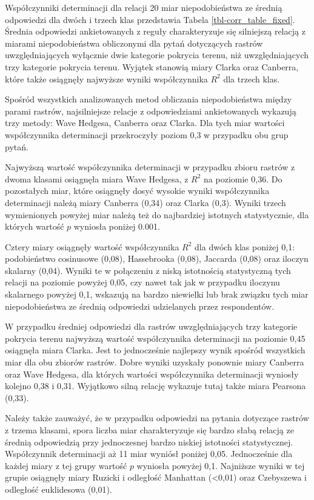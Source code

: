 \documentclass{amuthesis}
\begin{document}
Współczynniki determinacji dla relacji 20 miar niepodobieństwa ze
średnią odpowiedzi dla dwóch i trzech klas przedstawia Tabela
\ref{tbl-corr_table_fixed}. Średnia odpowiedzi ankietowanych z reguły
charakteryzuje się silniejszą relacją z miarami niepodobieństwa
obliczonymi dla pytań dotyczących rastrów uwzględniających wyłącznie
dwie kategorie pokrycia terenu, niż uwzględniających trzy kategorie
pokrycia terenu. Wyjątek stanowią miary Clarka oraz Canberra, które
także osiągnęły najwyższe wyniki współczynnika \(R^2\) dla trzech klas.

Spośród wszystkich analizowanych metod obliczania niepodobieństwa między
parami rastrów, najsilniejsze relacje z odpowiedziami ankietowanych
wykazują trzy metody: Wave Hedgesa, Canberra oraz Clarka. Dla tych miar
wartości współczynnika determinacji przekroczyły poziom 0,3 w przypadku
obu grup pytań.

Najwyższą wartość współczynnika determinacji w przypadku zbioru rastrów
z dwoma klasami osiągnęła miara Wave Hedgesa, z \(R^2\) na poziomie
0,36. Do pozostałych miar, które osiągnęły dosyć wysokie wyniki
współczynnika determinacji należą miary Canberra (0,34) oraz Clarka
(0,3). Wyniki trzech wymienionych powyżej miar należą też do najbardziej
istotnych statystycznie, dla których wartość \(p\) wyniosła poniżej
0.001.

Cztery miary osiągnęły wartość współczynnika \(R^2\) dla dwóch klas
poniżej 0,1: podobieństwo cosinusowe (0,08), Hassebrooka (0,08),
Jaccarda (0,08) oraz iloczyn skalarny (0,04). Wyniki te w połączeniu z
niską istotnością statystyczną tych relacji na poziomie powyżej 0,05,
czy nawet tak jak w przypadku iloczynu skalarnego powyżej 0,1, wskazują
na bardzo niewielki lub brak związku tych miar niepodobieństwa ze
średnią odpowiedzi udzielanych przez respondentów.

W przypadku średniej odpowiedzi dla rastrów uwzględniających trzy
kategorie pokrycia terenu najwyższą wartość współczynnika determinacji
na poziomie 0,45 osiągnęła miara Clarka. Jest to jednocześnie najlepszy
wynik spośród wszystkich miar dla obu zbiorów rastrów. Dobre wyniki
uzyskały ponownie miary Canberra oraz Wave Hedgesa, dla których wartości
współczynnika determinacji wyniosły kolejno 0,38 i 0,31. Wyjątkowo silną
relację wykazuje tutaj także miara Pearsona (0,33).

Należy także zauważyć, że w przypadku odpowiedzi na pytania dotyczące
rastrów z trzema klasami, spora liczba miar charakteryzuje się bardzo
słabą relacją ze średnią odpowiedzią przy jednoczesnej bardzo niskiej
istotności statystycznej. Współczynnik determinacji aż 11 miar wyniósł
poniżej 0,05. Jednocześnie dla każdej miary z tej grupy wartość \(p\)
wyniosła powyżej 0,1. Najniższe wyniki w tej grupie osiągnęły miary
Ruzicki i odległość Manhattan (\textless0,01) oraz Czebyszewa i
odległość euklidesowa (0,01).
\end{document}
